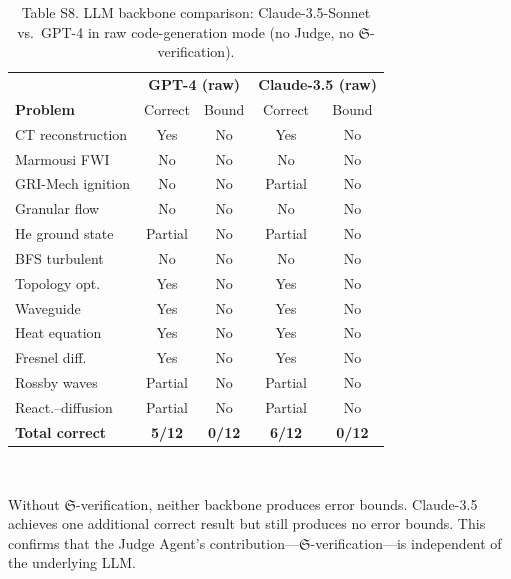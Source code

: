 \documentclass[11pt,a4paper]{article}
\newcommand{\Sclass}{\mathfrak{S}}
\begin{document}
\begin{table}[htbp]
\centering
\caption{Table S8. LLM backbone comparison: Claude-3.5-Sonnet vs.\ GPT-4 in raw code-generation mode (no Judge, no $\Sclass$-verification).}
\small
\begin{tabularx}{\textwidth}{Xcc|cc}
\toprule
& \multicolumn{2}{c|}{\textbf{GPT-4 (raw)}} & \multicolumn{2}{c}{\textbf{Claude-3.5 (raw)}} \\
\textbf{Problem} & Correct & Bound & Correct & Bound \\
\midrule
CT reconstruction & Yes & No & Yes & No \\
Marmousi FWI & No & No & No & No \\
GRI-Mech ignition & No & No & Partial & No \\
Granular flow & No & No & No & No \\
He ground state & Partial & No & Partial & No \\
BFS turbulent & No & No & No & No \\
Topology opt. & Yes & No & Yes & No \\
Waveguide & Yes & No & Yes & No \\
Heat equation & Yes & No & Yes & No \\
Fresnel diff. & Yes & No & Yes & No \\
Rossby waves & Partial & No & Partial & No \\
React.--diffusion & Partial & No & Partial & No \\
\midrule
\textbf{Total correct} & \textbf{5/12} & \textbf{0/12} & \textbf{6/12} & \textbf{0/12} \\
\bottomrule
\end{tabularx}\\[3pt]
\raggedright\scriptsize Without $\Sclass$-verification, neither backbone produces error bounds. Claude-3.5 achieves one additional correct result but still produces no error bounds. This confirms that the Judge Agent's contribution---$\Sclass$-verification---is independent of the underlying LLM.
\end{table}
\end{document}
